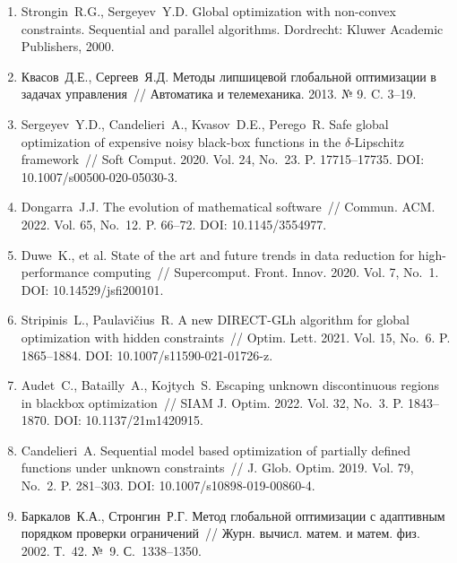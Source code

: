 \documentclass[a4paper,12pt,russian]{article}
\begin{document}
\begin{enumerate}
\item \label{rfa:rulit:Strongin2000}
Strongin~R.G., Sergeyev~Y.D. Global optimization with non-convex constraints. Sequential and parallel algorithms. Dordrecht: Kluwer Academic Publishers, 2000.

\item \label{rfa:rulit:Kvasov2013}
Квасов~Д.Е., Сергеев~Я.Д. Методы липшицевой глобальной оптимизации в задачах управления~// Автоматика и телемеханика. 2013. № 9. C. 3--19.

\item \label{rfa:rulit:Sergeyev2020}
Sergeyev~Y.D., Candelieri~A., Kvasov~D.E., Perego~R. Safe global optimization of expensive noisy black-box functions in the $\delta$-Lipschitz framework~// 
Soft Comput. 2020. Vol. 24, No.~23. P. 17715--17735. DOI: 10.1007/s00500-020-05030-3.

\item \label{rfa:rulit:Dongarra2022}
Dongarra~J.J. The evolution of mathematical software~// Commun. ACM. 2022. Vol. 65, No.~12. P. 66--72. DOI: 10.1145/3554977.

\item \label{rfa:rulit:Duwe2020}
Duwe~K., et al. State of the art and future trends in data reduction for high-performance computing~// Supercomput. Front. Innov. 2020. Vol. 7, No.~1. DOI: 10.14529/jsfi200101.

\item \label{rfa:rulit:Stripinis2021}
Stripinis~L., Paulavi{\v c}ius~R. A new {DIRECT}-{GLh} algorithm for global optimization with hidden constraints~// Optim. Lett. 2021. Vol. 15, No.~6. P. 1865--1884.
DOI: 10.1007/s11590-021-01726-z.

\item \label{rfa:rulit:Audet2022}
Audet~C., Batailly~A., Kojtych~S. Escaping unknown discontinuous regions in blackbox optimization~// SIAM J. Optim. 2022. Vol. 32, No.~3. P. 1843--1870. DOI: 10.1137/21m1420915.

\item \label{rfa:rulit:Candelieri2019}
Candelieri~A. Sequential model based optimization of partially defined functions
under unknown constraints~// J. Glob. Optim. 2019. Vol. 79, No.~2. P. 281--303. DOI: 10.1007/s10898-019-00860-4.

\item \label{rfa:rulit:Sergeyev2003}
Баркалов~К.А., Стронгин~Р.Г. Метод глобальной оптимизации с адаптивным порядком проверки ограничений~// Журн. вычисл. матем. и матем. физ. 2002. Т.~42. №~9. С.~1338--1350.


\end{enumerate}
\end{document}
